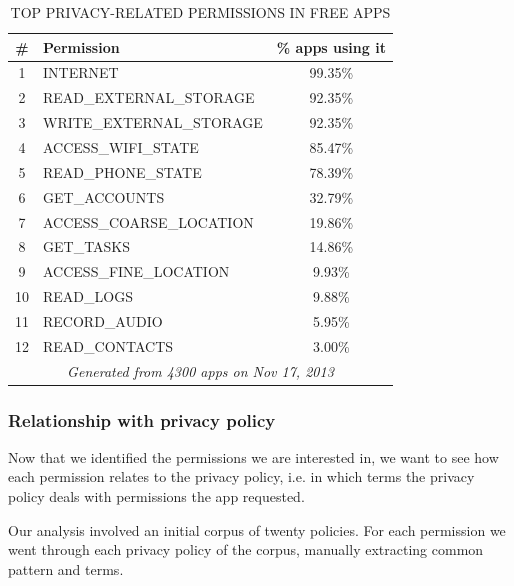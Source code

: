 \documentclass[twoside,letterpaper]{soups}
\theoremstyle{definition}
\begin{document}
\begin{table}[ht]
    \caption{TOP PRIVACY-RELATED PERMISSIONS IN FREE APPS}
    \label{tab:top-privacy-related-permissions}
    \centering
    \begin{tabular}{clc}
        \toprule
            \#   & Permission & \% apps using it \\
            \midrule
                1  & INTERNET                       &   99.35\% \\
                2  & READ\_EXTERNAL\_STORAGE        &   92.35\% \\
                3  & WRITE\_EXTERNAL\_STORAGE       &   92.35\% \\
                4  & ACCESS\_WIFI\_STATE            &   85.47\% \\
                5  & READ\_PHONE\_STATE             &   78.39\% \\
                6  & GET\_ACCOUNTS                  &   32.79\% \\
                7  & ACCESS\_COARSE\_LOCATION       &   19.86\% \\
                8  & GET\_TASKS                     &   14.86\% \\
                9  & ACCESS\_FINE\_LOCATION         &   9.93\%  \\
                10 & READ\_LOGS                     &   9.88\%  \\
                11 & RECORD\_AUDIO                  &   5.95\%  \\
                12 & READ\_CONTACTS                 &   3.00\%  \\
        \midrule
            \multicolumn{3}{c}{\footnotesize \emph{Generated from 4300 apps on Nov 17, 2013}} \\
        \bottomrule
    \end{tabular}
\end{table}

\subsubsection{Relationship with privacy policy}
Now that we identified the permissions we are interested in, we want to see how each permission relates to the privacy policy, i.e. in which terms the privacy policy deals with permissions the app requested.

Our analysis involved an initial corpus of twenty policies. For each permission we went through each privacy policy of the corpus, manually extracting common pattern and terms.
\end{document}
